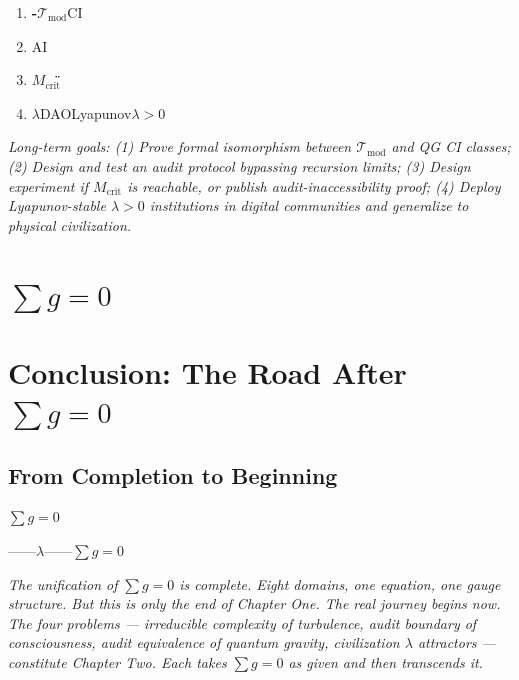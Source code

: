 \documentclass[12pt,a4paper]{article}
\theoremstyle{remark}
\newcommand{\T}{\mathcal{T}}
\begin{document}
\begin{enumerate}[label=\textbf{Q\arabic*:}, leftmargin=*]
    \item \textbf{-}$\T_{\text{mod}}$CI
    
    \item \textbf{}AI
    
    \item \textbf{}$M_{\text{crit}}$\"\"
    
    \item \textbf{$\lambda$}DAOLyapunov$\lambda > 0$
\end{enumerate}

\medskip
\noindent\textit{Long-term goals: (1) Prove formal isomorphism between $\T_{\text{mod}}$ and QG CI classes; (2) Design and test an audit protocol bypassing recursion limits; (3) Design experiment if $M_{\text{crit}}$ is reachable, or publish audit-inaccessibility proof; (4) Deploy Lyapunov-stable $\lambda > 0$ institutions in digital communities and generalize to physical civilization.}

\newpage


\section{$\sum g = 0$}
\section*{Conclusion: The Road After $\sum g = 0$}

\subsection{ From Completion to Beginning}

$\sum g = 0$

——$\lambda$——$\sum g = 0$

\medskip
\noindent\textit{The unification of $\sum g = 0$ is complete. Eight domains, one equation, one gauge structure. But this is only the end of Chapter One. The real journey begins now. The four problems — irreducible complexity of turbulence, audit boundary of consciousness, audit equivalence of quantum gravity, civilization $\lambda$ attractors — constitute Chapter Two. Each takes $\sum g = 0$ as given and then transcends it.}
\end{document}
